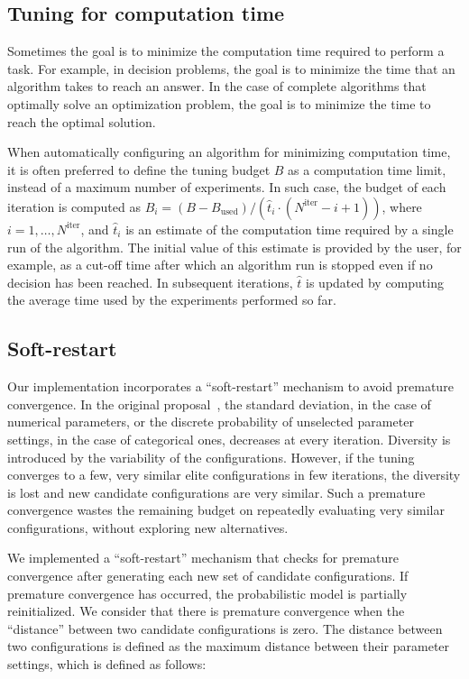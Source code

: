 \documentclass[a4paper]{article}
\newcommand{\IFRACE}{\text{I/F-Race}\xspace}
\newcommand{\iter}{\ensuremath{i}\xspace}
\newcommand{\Budget}{\ensuremath{B}\xspace}
\newcommand{\Budgeti}{\ensuremath{\Budget_{\iter}}\xspace}
\newcommand{\Bused}{\ensuremath{\Budget_\text{used}}\xspace}
\newcommand{\Niter}{\ensuremath{N^\text{iter}}\xspace}
\newcommand{\tEstimate}{\ensuremath{\hat{t}}\xspace}
\begin{document}
\subsection{Tuning for computation time}\label{sec:time}

Sometimes the goal is to minimize the computation time required to
perform a task. For example, in decision problems, the goal is to
minimize the time that an algorithm takes to reach an answer. In the
case of complete algorithms that optimally solve an optimization
problem, the goal is to minimize the time to reach the optimal
solution. 

When automatically configuring an algorithm for minimizing computation
time, it is often preferred to define the tuning budget $\Budget$ as a
computation time limit, instead of a maximum number of experiments. In
such case, the budget of each iteration is computed as $\Budgeti =
(\Budget - \Bused) / (\tEstimate_{\iter}\cdot(\Niter - \iter + 1))$,
where $\iter = 1, \dotsc, \Niter$, and $\tEstimate_{\iter}$ is an
estimate of the computation time required by a single run of the
algorithm. The initial value of this estimate is provided by the user,
for example, as a cut-off time after which an algorithm run is stopped
even if no decision has been reached.  In subsequent iterations,
$\tEstimate$ is updated by computing the average time used by the
experiments performed so far.


\subsection{Soft-restart}

Our implementation incorporates a ``soft-restart'' mechanism to avoid
premature convergence. In the original \IFRACE
proposal~\citep{BalBirStu07}, the standard deviation, in the case of
numerical parameters, or the discrete probability of unselected
parameter settings, in the case of categorical ones, decreases at every
iteration. Diversity is introduced by the variability of the
configurations. However, if the tuning converges to a few, very
similar elite configurations in few iterations, the diversity is lost
and new candidate configurations are very similar. Such a premature
convergence wastes the remaining  budget on repeatedly
evaluating very similar configurations, without exploring new
alternatives.

We implemented a ``soft-restart'' mechanism that checks for premature
convergence after generating each new set of candidate configurations. If
premature convergence has occurred, the probabilistic model is
partially reinitialized. We consider that there is premature
convergence when the ``distance'' between two candidate
configurations is zero. The
distance between two configurations is defined as the maximum distance
between their parameter settings, which is defined as follows:
\end{document}
